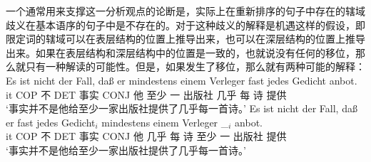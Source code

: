 %
一个通常用来支撑这一分析观点的论断是，实际上在重新排序的句子中存在的辖域歧义在基本语序的句子中是不存在的。对于这种歧义的解释是机遇这样的假设，即限定词的辖域可以在表层结构的位置上推导出来，也可以在深层结构的位置上推导出来。如果在表层结构和深层结构中的位置是一致的，也就说没有任何的移位，那么就只有一种解读的可能性。但是，如果发生了移位，那么就有两种可能的解释\citep[\page ]{Frey93a}：
\eal
\ex 
\gll Es ist nicht der Fall, daß er mindestens einem Verleger fast jedes Gedicht anbot.\\
     it COP 不 DET 事实 CONJ 他 至少 一 出版社 几乎 每 诗 提供\\
\glt `事实并不是他给至少一家出版社提供了几乎每一首诗。'
\ex 
\gll Es ist nicht der Fall, daß er fast jedes Gedicht$_i$ mindestens einem Verleger \_$_i$ anbot.\\
	 it COP 不 DET 事实 CONJ 他 几乎 每 诗 至少 一 出版社 {} 提供\\
\glt `事实并不是他给至少一家出版社提供了几乎每一首诗。'
\zl

